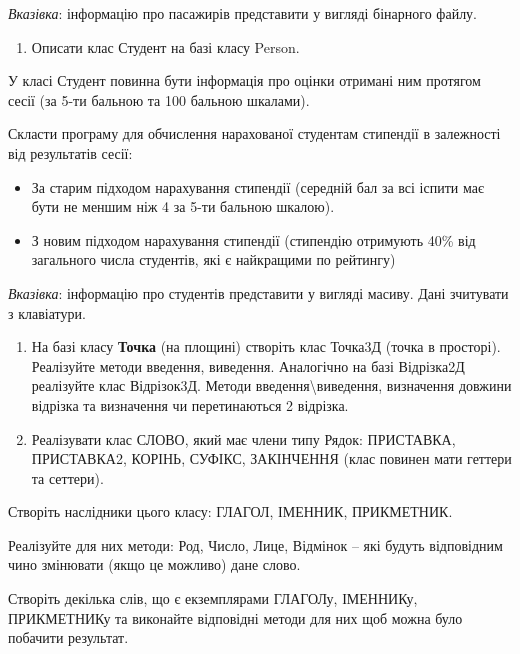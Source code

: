 \documentclass[]{article}
\begin{document}
\emph{\emph{Вказівка}}: інформацію про пасажирів представити у вигляді
бінарного файлу.

\begin{enumerate}
\def\labelenumi{\arabic{enumi})}
\item
  Описати клас Студент на базі класу Person.
\end{enumerate}

У класі Студент повинна бути інформація про оцінки отримані ним протягом
сесії (за 5-ти бальною та 100 бальною шкалами).

Скласти програму для обчислення нарахованої студентам стипендії в
залежності від результатів сесії:

\begin{itemize}
\item
  За старим підходом нарахування стипендії (середній бал за всі іспити
  має бути не меншим ніж 4 за 5-ти бальною шкалою).
\item
  З новим підходом нарахування стипендії (стипендію отримують 40\% від
  загального числа студентів, які є найкращими по рейтингу)
\end{itemize}

\emph{\emph{Вказівка}}: інформацію про студентів представити у вигляді
масиву. Дані зчитувати з клавіатури.

\begin{enumerate}
\def\labelenumi{\arabic{enumi})}
\item
  На базі класу \textbf{Точка} (на площині) створіть клас Точка3Д (точка
  в просторі). Реалізуйте методи введення, виведення. Аналогічно на базі
  Відрізка2Д реалізуйте клас Відрізок3Д. Методи
  введення\textbackslash{}виведення, визначення довжини відрізка та
  визначення чи перетинаються 2 відрізка.
\item
  Реалізувати клас СЛОВО, який має члени типу Рядок: ПРИСТАВКА,
  ПРИСТАВКА2, КОРІНЬ, СУФІКС, ЗАКІНЧЕННЯ (клас повинен мати геттери та
  сеттери).
\end{enumerate}

Створіть наслідники цього класу: ГЛАГОЛ, ІМЕННИК, ПРИКМЕТНИК.

Реалізуйте для них методи: Род, Число, Лице, Відмінок -- які будуть
відповідним чино змінювати (якщо це можливо) дане слово.

Створіть декілька слів, що є екземплярами ГЛАГОЛу, ІМЕННИКу, ПРИКМЕТНИКу
та виконайте відповідні методи для них щоб можна було побачити
результат.

\protect\hypertarget{_Hlk54461599}{}{}
\end{document}
